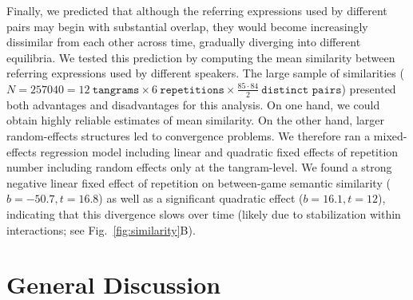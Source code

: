\documentclass[alpha-refs]{wiley-article}
\begin{document}
Finally, we predicted that although the referring expressions used by different pairs may begin with substantial overlap, they would become increasingly dissimilar from each other across time, gradually diverging into different equilibria.
We tested this prediction by computing the mean similarity between referring expressions used by different speakers.
The large sample of similarities ($N = 257040 = 12~\texttt{tangrams} \times 6~\texttt{repetitions} \times \frac{85 \cdot 84}{2}~\texttt{distinct pairs}$) presented both advantages and disadvantages for this analysis.
On one hand, we could obtain highly reliable estimates of mean similarity. 
On the other hand, larger random-effects structures led to convergence problems.
We therefore ran a mixed-effects regression model including linear and quadratic fixed effects of repetition number including random effects only at the tangram-level. 
We found a strong negative linear fixed effect of repetition on between-game semantic similarity ($b = -50.7, t= 16.8$) as well as a significant quadratic effect ($b= 16.1, t = 12$), indicating that this divergence slows over time (likely due to stabilization within interactions; see Fig.~\ref{fig:similarity}B).



\section{General Discussion}
\label{sec:discussion}
\end{document}
